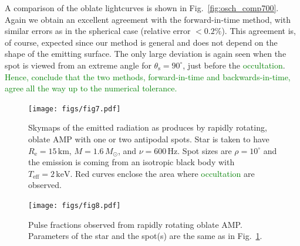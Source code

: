 \documentclass{aa}
\newcommand{\refe}[1]{\textcolor{green}{{#1}}}
\newcommand{\refedel}[1]{}
\newcommand{\Msun}{\ensuremath{M_{\odot}}}
\begin{document}
A comparison of the oblate lightcurves is shown in Fig.~\ref{fig:osch_comp700}.
Again we obtain an excellent agreement with the forward-in-time method, with similar errors as in the spherical case (relative error $< 0.2\%$).
This agreement is, of course, expected since our method is general and does not depend on the shape of the emitting surface.
The only large deviation is again seen when the spot is viewed from an extreme angle for $\theta_{\mathrm{s}} = 90^{\circ}$, just before the \refedel{eclipse}\refe{occultation}.
\refe{Hence, conclude that the two methods, forward-in-time and backwards-in-time, agree all the way up to the numerical tolerance.}



\begin{figure}
\texttt{[image: figs/fig7.pdf]}
\caption{\label{fig:skymap}
    Skymaps of the emitted radiation as produces by rapidly rotating, oblate AMP with one or two antipodal spots.
    Star is taken to have $R_{\mathrm{e}} = 15\,\mathrm{km}$, $M=1.6\,\Msun$, and $\nu = 600\,\mathrm{Hz}$.
    Spot sizes are $\rho = 10^{\circ}$ and the emission is coming from an isotropic black body with $T_{\mathrm{eff}} = 2\,\mathrm{keV}$.
    Red curves enclose the area where \refedel{eclipses}\refe{occultation} are observed.
  }
\end{figure}

\begin{figure}
\texttt{[image: figs/fig8.pdf]}
\caption{\label{fig:pulsefracs}
    Pulse fractions observed from rapidly rotating oblate AMP.
    Parameters of the star and the spot(s) are the same as in Fig.~\ref{fig:skymap}.
  }
\end{figure}
\end{document}
